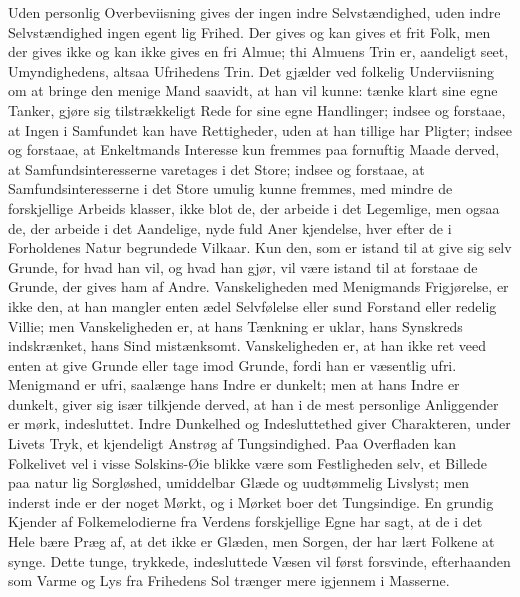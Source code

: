 \documentclass[12pt]{book}
\newcommand{\opage}[1]{\marginnote{\footnotesize\textit{[#1]}}}
\begin{document}
Uden personlig Overbeviisning gives der ingen indre
Selvstændighed, uden indre Selvstændighed ingen egent\-%
lig Frihed. Der gives og kan gives et frit Folk, men der
gives ikke og kan ikke gives en fri Almue; thi Almuens
Trin er, aandeligt seet, Umyndighedens, altsaa Ufrihedens
Trin. Det gjælder ved folkelig Underviisning om at
bringe den menige Mand saavidt, at han vil kunne:
tænke klart sine egne Tanker, gjøre sig tilstrækkeligt
Rede for sine egne Handlinger; indsee og forstaae, at
Ingen i Samfundet kan have Rettigheder, uden at han
tillige har Pligter; indsee og forstaae, at Enkeltmands
Interesse kun fremmes paa fornuftig Maade derved, at
Samfundsinteresserne varetages i det Store; indsee og
\opage{288}\setcounter{footnote}{0}%
forstaae, at Samfundsinteresserne i det Store umulig
kunne fremmes, med mindre de forskjellige Arbeids\-%
klasser, ikke blot de, der arbeide i det Legemlige, men
ogsaa de, der arbeide i det Aandelige, nyde fuld Aner\-%
kjendelse, hver efter de i Forholdenes Natur begrundede
Vilkaar. Kun den, som er istand til at give sig selv
Grunde, for hvad han vil, og hvad han gjør, vil være
istand til at forstaae de Grunde, der gives ham af Andre.
Vanskeligheden med Menigmands Frigjørelse, er ikke
den, at han mangler enten ædel Selvfølelse eller sund
Forstand eller redelig Villie; men Vanskeligheden er, at
hans Tænkning er uklar, hans Synskreds indskrænket,
hans Sind mistænksomt. Vanskeligheden er, at han
ikke ret veed enten at give Grunde eller tage imod
Grunde, fordi han er væsentlig ufri. Menigmand er
ufri, saalænge hans Indre er dunkelt; men at hans Indre
er dunkelt, giver sig især tilkjende derved, at han i de
mest personlige Anliggender er mørk, indesluttet. Indre
Dunkelhed og Indesluttethed giver Charakteren, under
Livets Tryk, et kjendeligt Anstrøg af Tungsindighed.
Paa Overfladen kan Folkelivet vel i visse Solskins-Øie\-%
blikke være som Festligheden selv, et Billede paa natur\-%
lig Sorgløshed, umiddelbar Glæde og uudtømmelig
Livslyst; men inderst inde er der noget Mørkt, og i
Mørket boer det Tungsindige. En grundig Kjender af
Folkemelodierne fra Verdens forskjellige Egne har sagt,
at de i det Hele bære Præg af, at det ikke er Glæden,
men Sorgen, der har lært Folkene at synge. Dette
tunge, trykkede, indesluttede Væsen vil først forsvinde,
efterhaanden som Varme og Lys fra Frihedens Sol
trænger mere igjennem i Masserne.
\end{document}
